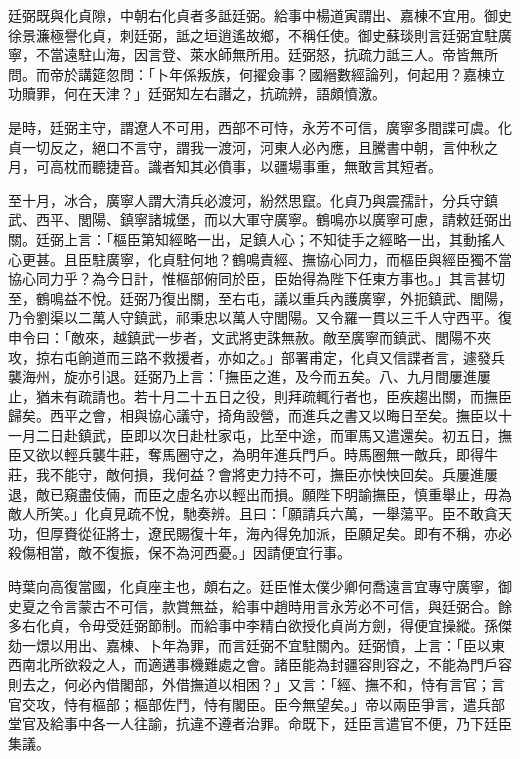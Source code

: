 \begin{pinyinscope}
廷弼既與化貞隙，中朝右化貞者多詆廷弼。給事中楊道寅謂出、嘉棟不宜用。御史徐景濂極譽化貞，刺廷弼，詆之垣逍遙故鄉，不稱任使。御史蘇琰則言廷弼宜駐廣寧，不當遠駐山海，因言登、萊水師無所用。廷弼怒，抗疏力詆三人。帝皆無所問。而帝於講筵忽問：「卜年係叛族，何擢僉事？國縉數經論列，何起用？嘉棟立功贖罪，何在天津？」廷弼知左右譖之，抗疏辨，語頗憤激。

是時，廷弼主守，謂遼人不可用，西部不可恃，永芳不可信，廣寧多間諜可虞。化貞一切反之，絕口不言守，謂我一渡河，河東人必內應，且騰書中朝，言仲秋之月，可高枕而聽捷音。識者知其必僨事，以疆場事重，無敢言其短者。

至十月，冰合，廣寧人謂大清兵必渡河，紛然思竄。化貞乃與震孺計，分兵守鎮武、西平、閭陽、鎮寧諸城堡，而以大軍守廣寧。鶴鳴亦以廣寧可慮，請敕廷弼出關。廷弼上言：「樞臣第知經略一出，足鎮人心；不知徒手之經略一出，其動搖人心更甚。且臣駐廣寧，化貞駐何地？鶴鳴責經、撫協心同力，而樞臣與經臣獨不當協心同力乎？為今日計，惟樞部俯同於臣，臣始得為陛下任東方事也。」其言甚切至，鶴鳴益不悅。廷弼乃復出關，至右屯，議以重兵內護廣寧，外扼鎮武、閭陽，乃令劉渠以二萬人守鎮武，祁秉忠以萬人守閭陽。又令羅一貫以三千人守西平。復申令曰：「敵來，越鎮武一步者，文武將吏誅無赦。敵至廣寧而鎮武、閭陽不夾攻，掠右屯餉道而三路不救援者，亦如之。」部署甫定，化貞又信諜者言，遽發兵襲海州，旋亦引退。廷弼乃上言：「撫臣之進，及今而五矣。八、九月間屢進屢止，猶未有疏請也。若十月二十五日之役，則拜疏輒行者也，臣疾趨出關，而撫臣歸矣。西平之會，相與協心議守，掎角設營，而進兵之書又以晦日至矣。撫臣以十一月二日赴鎮武，臣即以次日赴杜家屯，比至中途，而軍馬又遣還矣。初五日，撫臣又欲以輕兵襲牛莊，奪馬圈守之，為明年進兵門戶。時馬圈無一敵兵，即得牛莊，我不能守，敵何損，我何益？會將吏力持不可，撫臣亦怏怏回矣。兵屢進屢退，敵已窺盡伎倆，而臣之虛名亦以輕出而損。願陛下明諭撫臣，慎重舉止，毋為敵人所笑。」化貞見疏不悅，馳奏辨。且曰：「願請兵六萬，一舉蕩平。臣不敢貪天功，但厚賚從征將士，遼民賜復十年，海內得免加派，臣願足矣。即有不稱，亦必殺傷相當，敵不復振，保不為河西憂。」因請便宜行事。

時葉向高復當國，化貞座主也，頗右之。廷臣惟太僕少卿何喬遠言宜專守廣寧，御史夏之令言蒙古不可信，款賞無益，給事中趙時用言永芳必不可信，與廷弼合。餘多右化貞，令毋受廷弼節制。而給事中李精白欲授化貞尚方劍，得便宜操縱。孫傑劾一燝以用出、嘉棟、卜年為罪，而言廷弼不宜駐關內。廷弼憤，上言：「臣以東西南北所欲殺之人，而適遘事機難處之會。諸臣能為封疆容則容之，不能為門戶容則去之，何必內借閣部，外借撫道以相困？」又言：「經、撫不和，恃有言官；言官交攻，恃有樞部；樞部佐鬥，恃有閣臣。臣今無望矣。」帝以兩臣爭言，遣兵部堂官及給事中各一人往諭，抗違不遵者治罪。命既下，廷臣言遣官不便，乃下廷臣集議。


\end{pinyinscope}
